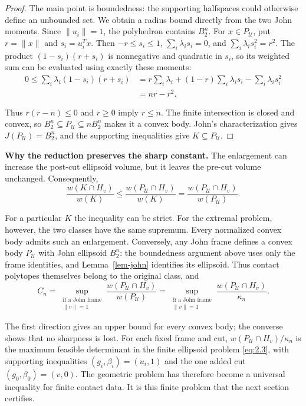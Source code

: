 \begin{proof}
The main point is boundedness: the supporting halfspaces could
otherwise define an unbounded set. We obtain a radius bound directly from
the two John moments. Since $\|u_i\|=1$, the polyhedron contains $B_2^n$.
For $x\in P_{\mathcal U}$, put $r=\|x\|$ and $s_i=u_i^Tx$. Then
$-r\le s_i\le1$, $\sum_i\lambda_i s_i=0$, and $\sum_i\lambda_i s_i^2=r^2$.
The product $(1-s_i)(r+s_i)$ is nonnegative and quadratic in $s_i$, so its
weighted sum can be evaluated using exactly these moments:
\begin{equation}\label{eq:2.19}
\begin{aligned}
0\le\sum_i\lambda_i(1-s_i)(r+s_i)
&=r\sum_i\lambda_i+(1-r)\sum_i\lambda_i s_i-\sum_i\lambda_i s_i^2\\
&=nr-r^2.
\end{aligned}
\end{equation}

Thus $r(r-n)\le0$ and $r\ge0$ imply $r\le n$. The finite intersection is closed and convex, so $B_2^n\subseteq P_{\mathcal U}\subseteq nB_2^n$ makes it a convex body. John's characterization gives $J(P_{\mathcal U})=B_2^n$, and the supporting inequalities give $K\subseteq P_{\mathcal U}$. 
\end{proof}

\textbf{Why the reduction preserves the sharp constant.} The enlargement can increase
the post-cut ellipsoid volume, but it leaves the pre-cut volume unchanged.
Consequently,
\begin{equation}\label{eq:2.20}
\frac{w(K\cap H_v)}{w(K)}
\le\frac{w(P_{\mathcal U}\cap H_v)}{w(K)}
=\frac{w(P_{\mathcal U}\cap H_v)}{w(P_{\mathcal U})}.
\end{equation}

For a particular $K$ the inequality can be strict. For the extremal problem,
however, the two classes have the same supremum. Every normalized convex body
admits such an enlargement. Conversely, any John frame defines a convex body
$P_{\mathcal U}$ with John ellipsoid $B_2^n$: the boundedness argument above
uses only the frame identities, and Lemma~\ref{lem-john} identifies its ellipsoid.
Thus contact polytopes themselves belong to the original class, and
\begin{equation}\label{eq:2.21}
C_n
=\sup_{\substack{\mathcal U\ \text{a John frame}\\\|v\|=1}}
\frac{w(P_{\mathcal U}\cap H_v)}{w(P_{\mathcal U})}
=\sup_{\substack{\mathcal U\ \text{a John frame}\\\|v\|=1}}
\frac{w(P_{\mathcal U}\cap H_v)}{\kappa_n}.
\end{equation}

The first direction gives an upper bound for every convex body; the converse
shows that no sharpness is lost. For each fixed frame and cut,
$w(P_{\mathcal U}\cap H_v)/\kappa_n$ is the maximum feasible determinant
in the finite ellipsoid problem \eqref{eq:2.3}, with supporting
inequalities $(g_i,\beta_i)=(u_i,1)$ and the one added cut $(g_0,\beta_0)=(v,0)$.
The geometric problem has therefore become a universal inequality for finite
contact data. It is this finite problem that the next section certifies.
